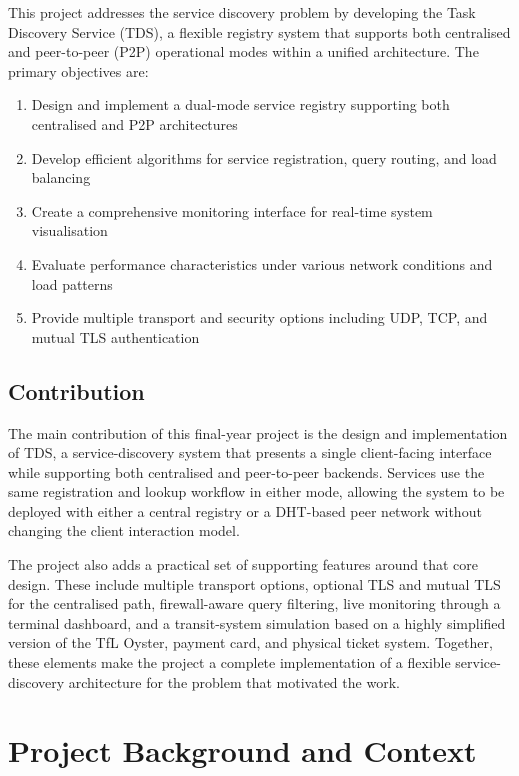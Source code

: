 \documentclass[10pt,a4paper]{article}
\begin{document}
This project addresses the service discovery problem by developing the Task Discovery Service (TDS), a flexible registry system that supports both centralised and peer-to-peer (P2P) operational modes within a unified architecture. The primary objectives are:

\begin{enumerate}
    \item Design and implement a dual-mode service registry supporting both centralised and P2P architectures
    \item Develop efficient algorithms for service registration, query routing, and load balancing
    \item Create a comprehensive monitoring interface for real-time system visualisation
    \item Evaluate performance characteristics under various network conditions and load patterns
    \item Provide multiple transport and security options including UDP, TCP, and mutual TLS authentication
\end{enumerate}

\subsection{Contribution}

The main contribution of this final-year project is the design and implementation of TDS, a service-discovery system that presents a single client-facing interface while supporting both centralised and peer-to-peer backends. Services use the same registration and lookup workflow in either mode, allowing the system to be deployed with either a central registry or a DHT-based peer network without changing the client interaction model.

The project also adds a practical set of supporting features around that core design. These include multiple transport options, optional TLS and mutual TLS for the centralised path, firewall-aware query filtering, live monitoring through a terminal dashboard, and a transit-system simulation based on a highly simplified version of the TfL Oyster, payment card, and physical ticket system. Together, these elements make the project a complete implementation of a flexible service-discovery architecture for the problem that motivated the work.

\section{Project Background and Context}
\end{document}
